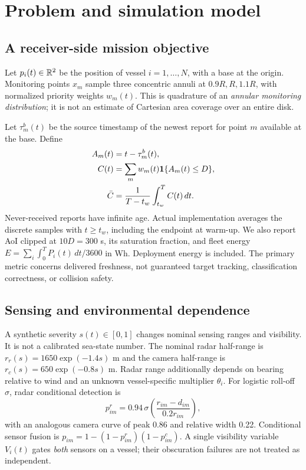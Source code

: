 \section{Problem and simulation model}
\subsection{A receiver-side mission objective}
Let $p_i(t)\in\mathbb R^2$ be the position of vessel $i=1,\ldots,N$, with a base at
the origin. Monitoring points $x_m$ sample three concentric annuli at
$0.9R,R,1.1R$, with normalized priority weights $w_m(t)$. This is quadrature of
an \emph{annular monitoring distribution}; it is not an estimate of Cartesian
area coverage over an entire disk.

Let $\tau_m^b(t)$ be the source timestamp of the newest report for point $m$
available at the base. Define
\begin{align}
 A_m(t)&=t-\tau_m^b(t),\\
 C(t)&=\sum_m w_m(t)\mathbf 1\{A_m(t)\leq D\},\label{eq:C}\\
 \bar C&=\frac{1}{T-t_w}\int_{t_w}^{T}C(t)\,dt .
\end{align}
Never-received reports have infinite age. Actual implementation averages the
discrete samples with $t\geq t_w$, including the endpoint at warm-up. We also
report AoI clipped at $10D=300$ s, its saturation fraction, and fleet energy
$E=\sum_i\int_0^T P_i(t)\,dt/3600$ in Wh. Deployment energy is included.
The primary metric concerns delivered freshness, not guaranteed target tracking,
classification correctness, or collision safety.

\subsection{Sensing and environmental dependence}
A synthetic severity $s(t)\in[0,1]$ changes nominal sensing ranges and visibility.
It is not a calibrated sea-state number. The nominal radar half-range is
$r_r(s)=1650\exp(-1.4s)$ m and the camera half-range is
$r_c(s)=650\exp(-0.8s)$ m. Radar range additionally depends on bearing relative
to wind and an unknown vessel-specific multiplier $\theta_i$.
For logistic roll-off $\sigma$, radar conditional detection is
\begin{equation}
 p^r_{im}=0.94\,\sigma\!\left(\frac{r_{im}-d_{im}}{0.2r_{im}}\right),
\end{equation}
with an analogous camera curve of peak 0.86 and relative width 0.22.
Conditional sensor fusion is $p_{im}=1-(1-p^r_{im})(1-p^c_{im})$.
A single visibility variable $V_i(t)$ gates \emph{both} sensors on a vessel;
their obscuration failures are not treated as independent.


